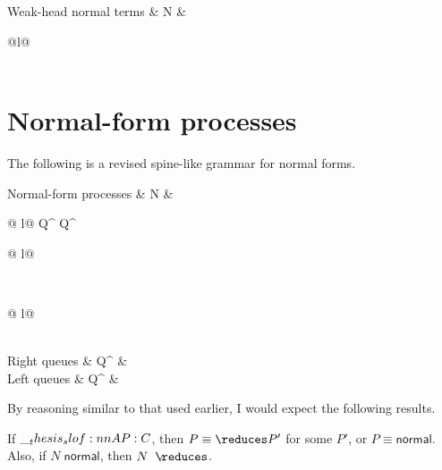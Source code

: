 \begin{syntax*}
  Weak-head normal terms & N &
    \begin{array}[t]{@{}l@{}}
      \fwd \mid \selectR{\kay} \mid \selectL{\kay} \\
      \mathllap{\mid {}}  \mid {} \\
      \mathllap{\mid {}}  \mid {}
    \end{array}
\end{syntax*}

\section{Normal-form processes}

The following is a revised spine-like grammar for normal forms.
\begin{syntax*}
  Normal-form processes & N &
    \fwd
    \begin{array}[t]{@{{} \mid {}}l@{}}
      Q^{\with} \mid Q^{\plus}
      \begin{array}[t]{@{{} \mid {}}l@{}}
         \\
      \end{array}
    \\
      \begin{array}[t]{@{{} \mid {}}l@{}}
         \\
      \end{array}
    \end{array}
  \\
  Right q{}ueues & Q^{\plus} &
     \mid \selectR{\kay}
  \\
  Left q{}ueues & Q^{\with} &
     \mid \selectL{\kay}
\end{syntax*}
By reasoning similar to that used earlier, I would expect the following results.
\begin{theorem}
  If $\slof{A |- P : C}$, then $P \equiv\reduces P'$ for some $P'$, or $P \equiv\mathrel{\mathsf{normal}}$.
  Also, if $N \;\mathsf{normal}$, then $N \longarrownot\reduces$.
\end{theorem}

